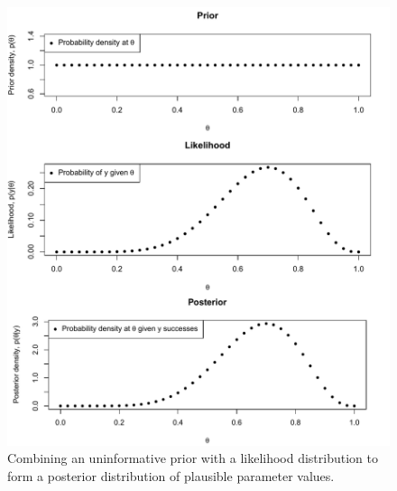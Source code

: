\documentclass[11pt,a4paper,article]{memoir} %
\begin{document}
\begin{figure}
\includegraphics[width=\textwidth]{Bayesian_inference.pdf}
\caption{Combining an uninformative prior with a likelihood distribution to form a posterior distribution of plausible parameter values.}
\label{fig:binom_bayes_inference}
\end{figure}
\end{document}
